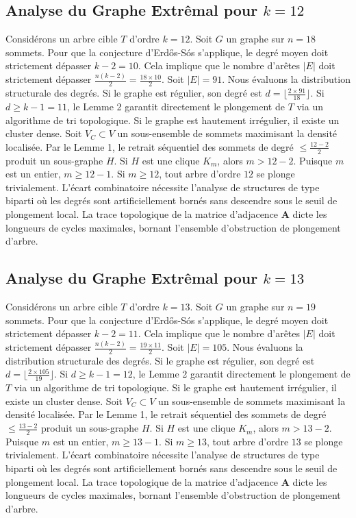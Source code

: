 \documentclass[11pt,a4paper]{article}
\begin{document}
\subsection{Analyse du Graphe Extr\^emal pour $k=12$}
Consid\'erons un arbre cible $T$ d'ordre $k=12$.
Soit $G$ un graphe sur $n=18$ sommets.
Pour que la conjecture d'Erd\H{o}s-S\'os s'applique, le degr\'e moyen doit strictement d\'epasser $k-2 = 10$.
Cela implique que le nombre d'ar\^etes $|E|$ doit strictement d\'epasser $\frac{n(k-2)}{2} = \frac{18 \times 10}{2}$.
Soit $|E| = 91$.
Nous \'evaluons la distribution structurale des degr\'es. Si le graphe est r\'egulier, son degr\'e est $d = \lfloor \frac{2 \times 91}{18} \rfloor$.
Si $d \geq k-1 = 11$, le Lemme 2 garantit directement le plongement de $T$ via un algorithme de tri topologique.
Si le graphe est hautement irr\'egulier, il existe un cluster dense. Soit $V_C \subset V$ un sous-ensemble de sommets maximisant la densit\'e localis\'ee.
Par le Lemme 1, le retrait s\'equentiel des sommets de degr\'e $\leq \frac{12-2}{2}$ produit un sous-graphe $H$.
Si $H$ est une clique $K_{m}$, alors $m > 12-2$. Puisque $m$ est un entier, $m \geq 12-1$. Si $m \geq 12$, tout arbre d'ordre $12$ se plonge trivialement.
L'\'ecart combinatoire n\'ecessite l'analyse de structures de type biparti o\`u les degr\'es sont artificiellement born\'es sans descendre sous le seuil de plongement local. La trace topologique de la matrice d'adjacence $\mathbf{A}$ dicte les longueurs de cycles maximales, bornant l'ensemble d'obstruction de plongement d'arbre.


\subsection{Analyse du Graphe Extr\^emal pour $k=13$}
Consid\'erons un arbre cible $T$ d'ordre $k=13$.
Soit $G$ un graphe sur $n=19$ sommets.
Pour que la conjecture d'Erd\H{o}s-S\'os s'applique, le degr\'e moyen doit strictement d\'epasser $k-2 = 11$.
Cela implique que le nombre d'ar\^etes $|E|$ doit strictement d\'epasser $\frac{n(k-2)}{2} = \frac{19 \times 11}{2}$.
Soit $|E| = 105$.
Nous \'evaluons la distribution structurale des degr\'es. Si le graphe est r\'egulier, son degr\'e est $d = \lfloor \frac{2 \times 105}{19} \rfloor$.
Si $d \geq k-1 = 12$, le Lemme 2 garantit directement le plongement de $T$ via un algorithme de tri topologique.
Si le graphe est hautement irr\'egulier, il existe un cluster dense. Soit $V_C \subset V$ un sous-ensemble de sommets maximisant la densit\'e localis\'ee.
Par le Lemme 1, le retrait s\'equentiel des sommets de degr\'e $\leq \frac{13-2}{2}$ produit un sous-graphe $H$.
Si $H$ est une clique $K_{m}$, alors $m > 13-2$. Puisque $m$ est un entier, $m \geq 13-1$. Si $m \geq 13$, tout arbre d'ordre $13$ se plonge trivialement.
L'\'ecart combinatoire n\'ecessite l'analyse de structures de type biparti o\`u les degr\'es sont artificiellement born\'es sans descendre sous le seuil de plongement local. La trace topologique de la matrice d'adjacence $\mathbf{A}$ dicte les longueurs de cycles maximales, bornant l'ensemble d'obstruction de plongement d'arbre.
\end{document}
